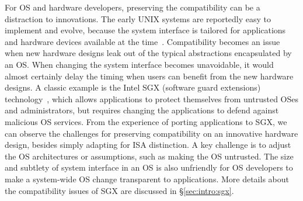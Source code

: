 For OS and hardware developers, preserving the compatibility can be a distraction to innovations.
The early UNIX systems are reportedly easy to implement and evolve, because
the system interface is tailored
for applications and hardware devices available at the time~\cite{ritchie78unix-retro}.
Compatibility becomes an issue
when new hardware designs leak out of the typical abstractions
encapsulated by an OS.
When changing the system interface becomes unavoidable,
it would almost certainly delay the timing when users can benefit from the new hardware designs.
A classic example is the Intel SGX (software guard extensions) technology~\cite{intelsgx},
which allows applications to protect themselves from untrusted OSes and administrators,
but requires changing the applications to defend against malicious OS services.
From the experience of porting applications to SGX,
we can observe the challenges for preserving compatibility on an innovative hardware design,
besides simply adapting for ISA distinction.
A key challenge is to adjust the OS architectures or assumptions,
such as making the OS untrusted.
The size and subtlety of system interface in an OS is also unfriendly for OS developers to make a system-wide OS change transparent to applications.
More details about the compatibility issues of SGX are discussed in \S\ref{sec:intro:sgx}.




